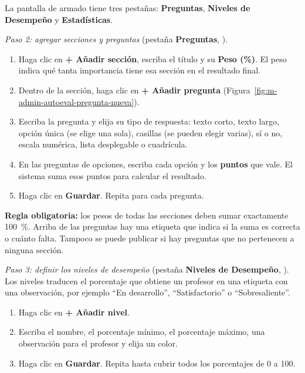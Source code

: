 
La pantalla de armado tiene tres pestañas: \textbf{Preguntas}, \textbf{Niveles de Desempeño} y \textbf{Estadísticas}.

\textit{Paso 2: agregar secciones y preguntas} (pestaña \textbf{Preguntas}, ).
\begin{enumerate}
    \item Haga clic en \textbf{+ Añadir sección}, escriba el título y su \textbf{Peso (\%)}. El peso indica qué tanta importancia tiene esa sección en el resultado final.
    \item Dentro de la sección, haga clic en \textbf{+ Añadir pregunta} (Figura~\ref{fig:m-admin-autoeval-pregunta-nueva}).
    \item Escriba la pregunta y elija su tipo de respuesta: texto corto, texto largo, opción única (se elige una sola), casillas (se pueden elegir varias), sí o no, escala numérica, lista desplegable o cuadrícula.
    \item En las preguntas de opciones, escriba cada opción y los \textbf{puntos} que vale. El sistema suma esos puntos para calcular el resultado.
    \item Haga clic en \textbf{Guardar}. Repita para cada pregunta.
\end{enumerate}


\textbf{Regla obligatoria:} los pesos de todas las secciones deben sumar exactamente 100~\%. Arriba de las preguntas hay una etiqueta que indica si la suma es correcta o cuánto falta. Tampoco se puede publicar si hay preguntas que no pertenecen a ninguna sección.

\textit{Paso 3: definir los niveles de desempeño} (pestaña \textbf{Niveles de Desempeño}, ). Los niveles traducen el porcentaje que obtiene un profesor en una etiqueta con una observación, por ejemplo ``En desarrollo'', ``Satisfactorio'' o ``Sobresaliente''.
\begin{enumerate}
    \item Haga clic en \textbf{+ Añadir nivel}.
    \item Escriba el nombre, el porcentaje mínimo, el porcentaje máximo, una observación para el profesor y elija un color.
    \item Haga clic en \textbf{Guardar}. Repita hasta cubrir todos los porcentajes de 0 a 100.
\end{enumerate}


